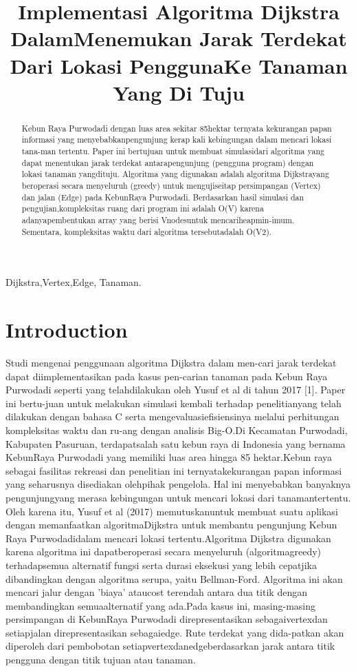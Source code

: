 \documentclass[conference]{IEEEtran}
\title{Implementasi Algoritma Dijkstra DalamMenemukan Jarak Terdekat Dari Lokasi PenggunaKe Tanaman Yang Di Tuju}
\author{\IEEEauthorblockN{Febrian Vivaldi}
\IEEEauthorblockA{\textit{School of Electrical Engineering and Informatics}\\
\textit{Institut Teknologi Bandung}\\
Bandung, Indonesia\\
Email : 18320035@std.stei.itb.ac.id}
}
\begin{document}
\maketitle

 \begin{abstract}
	Kebun Raya Purwodadi dengan luas area sekitar 85hektar ternyata kekurangan papan informasi yang menyebabkanpengunjung kerap kali 		kebingungan dalam mencari lokasi tana-man tertentu. Paper ini bertujuan untuk membuat simulasidari algoritma yang dapat menentukan jarak terdekat antarapengunjung (pengguna program) dengan lokasi tanaman yangdituju. Algoritma yang digunakan adalah algoritma Dijkstrayang beroperasi secara menyeluruh (greedy) untuk mengujiseitap persimpangan (Vertex) dan jalan (Edge) pada KebunRaya Purwodadi. Berdasarkan hasil simulasi dan pengujian,kompleksitas ruang dari program ini adalah O(V) karena adanyapembentukan array yang berisi Vnodesuntuk mencariheapmin-imum. Sementara, kompleksitas waktu dari algoritma tersebutadalah O(V2).~\cite{pradhan2013finding}
\end{abstract}

\begin{IEEEkeywords}
Dijkstra,Vertex,Edge, Tanaman.
\end{IEEEkeywords}

\section{Introduction}
Studi mengenai penggunaan algoritma Dijkstra dalam men-cari  jarak  terdekat  dapat  diimplementasikan  pada  kasus  pen-carian tanaman pada Kebun Raya Purwodadi seperti yang telahdilakukan oleh Yusuf et al di tahun 2017 [1]. Paper ini bertu-juan  untuk  melakukan  simulasi  kembali  terhadap  penelitianyang  telah  dilakukan  dengan  bahasa  C  serta  mengevaluasiefisiensinya  melalui  perhitungan  kompleksitas  waktu  dan  ru-ang dengan analisis Big-O.Di  Kecamatan  Purwodadi,  Kabupaten  Pasuruan,  terdapatsalah  satu  kebun  raya  di  Indonesia  yang  bernama  KebunRaya  Purwodadi  yang  memiliki  luas  area  hingga  85  hektar.Kebun raya sebagai fasilitas rekreasi dan penelitian ini ternyatakekurangan papan informasi yang seharusnya disediakan olehpihak pengelola. Hal ini menyebabkan banyaknya pengunjungyang merasa kebingungan untuk mencari lokasi dari tanamantertentu.  Oleh  karena  itu,  Yusuf  et  al  (2017)  memutuskanuntuk membuat suatu aplikasi dengan memanfaatkan algoritmaDijkstra untuk membantu pengunjung Kebun Raya Purwodadidalam mencari lokasi tertentu.Algoritma  Dijkstra  digunakan  karena  algoritma  ini  dapatberoperasi   secara   menyeluruh   (algoritmagreedy)   terhadapsemua alternatif fungsi serta durasi eksekusi yang lebih cepatjika  dibandingkan  dengan  algoritma  serupa,  yaitu  Bellman-Ford.  Algoritma  ini  akan  mencari  jalur  dengan  ’biaya’  ataucost terendah antara dua titik dengan membandingkan semuaalternatif yang ada.Pada  kasus  ini,  masing-masing  persimpangan  di  KebunRaya  Purwodadi  direpresentasikan  sebagaivertexdan  setiapjalan direpresentasikan sebagaiedge. Rute terdekat yang dida-patkan akan diperoleh dari pembobotan setiapvertexdanedgeberdasarkan  jarak  antara  titik  pengguna  dengan  titik  tujuan atau tanaman.
\end{document}

